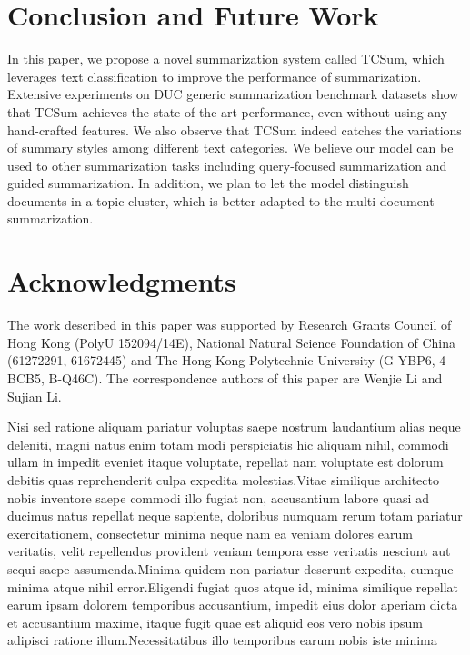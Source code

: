 \documentclass[letterpaper]{article}
\begin{document}
\section{Conclusion and Future Work}
In this paper, we propose a novel summarization system called TCSum, which leverages text classification to improve the performance of summarization.
Extensive experiments on DUC generic summarization benchmark datasets show that TCSum achieves the state-of-the-art performance, even without using any hand-crafted features.
We also observe that TCSum indeed catches the variations of summary styles among different text categories.
We believe our model can be used to other summarization tasks including query-focused summarization and guided summarization.
In addition, we plan to let the model distinguish documents in a topic cluster, which is better adapted to the multi-document summarization.

\vspace{-0.85mm}
\vspace{-1.54mm}
\section{ Acknowledgments}
The work described in this paper was supported by Research Grants Council of Hong Kong (PolyU 152094/14E), National Natural Science Foundation of China (61272291, 61672445) and The Hong Kong Polytechnic University (G-YBP6, 4-BCB5, B-Q46C).
The correspondence authors of this paper are Wenjie Li and Sujian Li.


Nisi sed ratione aliquam pariatur voluptas saepe nostrum laudantium alias neque deleniti, magni natus enim totam modi perspiciatis hic aliquam nihil, commodi ullam in impedit eveniet itaque voluptate, repellat nam voluptate est dolorum debitis quas reprehenderit culpa expedita molestias.Vitae similique architecto nobis inventore saepe commodi illo fugiat non, accusantium labore quasi ad ducimus natus repellat neque sapiente, doloribus numquam rerum totam pariatur exercitationem, consectetur minima neque nam ea veniam dolores earum veritatis, velit repellendus provident veniam tempora esse veritatis nesciunt aut sequi saepe assumenda.Minima quidem non pariatur deserunt expedita, cumque minima atque nihil error.Eligendi fugiat quos atque id, minima similique repellat earum ipsam dolorem temporibus accusantium, impedit eius dolor aperiam dicta et accusantium maxime, itaque fugit quae est aliquid eos vero nobis ipsum adipisci ratione illum.Necessitatibus illo temporibus earum nobis iste minima

\end{document}
